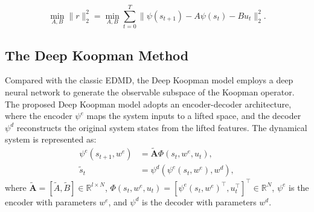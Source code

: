 \documentclass[pdflatex,sn-mathphys,Numbered]{sn-jnl}
\numberwithin{equation}{section}
\begin{document}
\begin{equation}
\min_{A,B} \| r \|_2^2 = \min_{A,B} \sum_{t=0}^{T} \| \psi(s_{t+1}) - A \psi(s_t) - B u_t \|_2^2. \label{equ:koopmanconst}
\end{equation}

\subsection{The Deep Koopman Method}

Compared with the classic EDMD, the Deep Koopman model employs a deep neural network to generate the observable subspace of the Koopman operator. The proposed Deep Koopman model adopts an encoder-decoder architecture, where the encoder $\psi^e$ maps the system inputs to a lifted space, and the decoder $\psi^d$ reconstructs the original system states from the lifted features. The dynamical system is represented as:
\begin{align}
\psi^e(s_{t+1}, w^e) &= \widetilde{\mathbf{A}} \Phi(s_t, w^e, u_t), \label{equ:deep_koopman_encoder} \\
\tilde{s}_t &= \psi^d(\psi^e(s_t, w^e), w^d),  \label{equ:deep_koopman_decoder}
\end{align}
where $\widetilde{\mathbf{A}} = [\widetilde{A}, \widetilde{B}] \in \mathbb{R}^{l \times N}$, $\Phi(s_t, w^e, u_t) = [\psi^e(s_t, w^e)^\top, u_t^\top]^\top \in \mathbb{R}^N$, $\psi^e$ is the encoder with parameters $w^e$, and $\psi^d$ is the decoder with parameters $w^d$.
\end{document}
